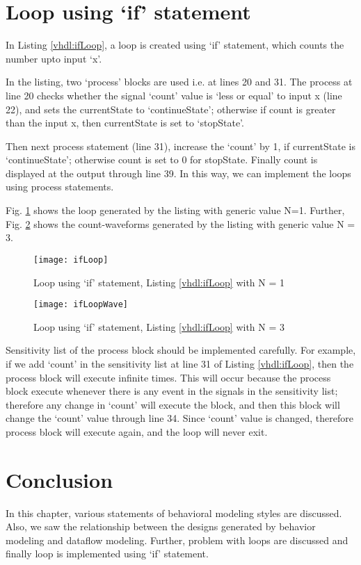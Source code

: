 \section{Loop using `if' statement}\label{sec:ifLoop}
In Listing \ref{vhdl:ifLoop}, a loop is created using `if' statement, which counts the number upto input `x'. 

\begin{explanation}
	In the listing, two `process' blocks are used i.e. at lines 20 and 31. The process at line 20 checks whether the signal `count' value is `less or equal' to input x (line 22), and sets the currentState to `continueState'; otherwise if count is greater than the input x, then currentState is set to `stopState'.
	
	Then next process statement (line 31), increase the `count' by 1, if currentState is `continueState'; otherwise count is set to 0 for stopState. Finally count is displayed at the output through line 39. In this way, we can implement the loops using process statements. 
	
	Fig. \ref{fig:ifLoop} shows the loop generated by the listing with generic value N=1. Further,  Fig. \ref{fig:ifLoopWave} shows the count-waveforms generated by the listing with generic value N = 3.
\end{explanation}


\begin{figure}[!h]
	\centering
	\texttt{[image: ifLoop]}
	\caption{Loop using `if' statement, Listing \ref{vhdl:ifLoop} with N = 1}
	\label{fig:ifLoop}
\end{figure}

\begin{figure}[!h]
	\centering
	\texttt{[image: ifLoopWave]}
	\caption{Loop using `if' statement, Listing \ref{vhdl:ifLoop} with N = 3}
	\label{fig:ifLoopWave}
\end{figure}

\begin{noNumBox}
	Sensitivity list of the process block should be implemented carefully. For example, if we add `count' in the sensitivity list at line 31 of Listing  \ref{vhdl:ifLoop}, then the process block will execute infinite times. This will occur because the process block execute whenever there is any event in the signals in the sensitivity list; therefore any change in `count' will execute the block, and then this block will change the `count' value through line 34. Since `count' value is changed, therefore process block will execute again, and the loop will never exit.  
\end{noNumBox}

\section{Conclusion}
In this chapter, various statements of behavioral modeling styles are discussed. Also, we saw the relationship between the designs generated by behavior modeling and dataflow modeling. Further, problem with loops are discussed and finally loop is implemented using `if' statement. 